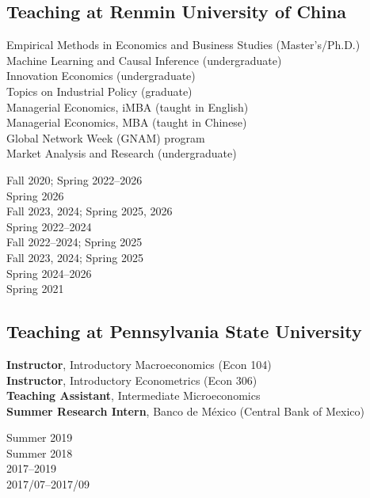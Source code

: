 \documentclass[letterpaper]{article}
\begin{document}
\subsection*{Teaching at Renmin University of China}
\begin{minipage}{0.64\textwidth}
  Empirical Methods in Economics and Business Studies (Master's/Ph.D.) \\
  Machine Learning and Causal Inference (undergraduate) \\
  Innovation Economics (undergraduate) \\
  Topics on Industrial Policy (graduate) \\
  Managerial Economics, iMBA (taught in English) \\
  Managerial Economics, MBA (taught in Chinese) \\
  Global Network Week (GNAM) program \\
  Market Analysis and Research (undergraduate)
\end{minipage}\hspace{0.02\textwidth}
\begin{minipage}{0.34\textwidth}
  \raggedleft
  Fall 2020; Spring 2022--2026 \\
  Spring 2026 \\
  Fall 2023, 2024; Spring 2025, 2026 \\
  Spring 2022--2024 \\
  Fall 2022--2024; Spring 2025 \\
  Fall 2023, 2024; Spring 2025 \\
  Spring 2024--2026 \\
  Spring 2021
\end{minipage}

\subsection*{Teaching at Pennsylvania State University}
\begin{minipage}{0.8\textwidth}
  \textbf{Instructor}, Introductory Macroeconomics (Econ 104) \\
  \textbf{Instructor}, Introductory Econometrics (Econ 306) \\
  \textbf{Teaching Assistant}, Intermediate Microeconomics \\
  \textbf{Summer Research Intern}, Banco de M\'exico (Central Bank of Mexico)
\end{minipage}
\begin{minipage}{0.2\textwidth}
  \raggedleft
  Summer 2019 \\
  Summer 2018 \\
  2017--2019 \\
  2017/07--2017/09
\end{minipage}
\end{document}
